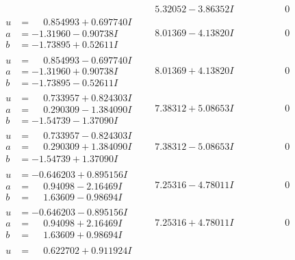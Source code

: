 \documentclass[1p]{elsarticle_modified}
\theoremstyle{definition}
\begin{document}
$$\begin{array}{c|c|c}
 & \phantom{-}5.32052 - 3.86352 I & \phantom{-0.000000 } 0 \\ \hline\begin{aligned}
u &= \phantom{-}0.854993 + 0.697740 I \\
a &= -1.31960 - 0.90738 I \\
b &= -1.73895 + 0.52611 I\end{aligned}
 & \phantom{-}8.01369 - 4.13820 I & \phantom{-0.000000 } 0 \\ \hline\begin{aligned}
u &= \phantom{-}0.854993 - 0.697740 I \\
a &= -1.31960 + 0.90738 I \\
b &= -1.73895 - 0.52611 I\end{aligned}
 & \phantom{-}8.01369 + 4.13820 I & \phantom{-0.000000 } 0 \\ \hline\begin{aligned}
u &= \phantom{-}0.733957 + 0.824303 I \\
a &= \phantom{-}0.290309 - 1.384090 I \\
b &= -1.54739 - 1.37090 I\end{aligned}
 & \phantom{-}7.38312 + 5.08653 I & \phantom{-0.000000 } 0 \\ \hline\begin{aligned}
u &= \phantom{-}0.733957 - 0.824303 I \\
a &= \phantom{-}0.290309 + 1.384090 I \\
b &= -1.54739 + 1.37090 I\end{aligned}
 & \phantom{-}7.38312 - 5.08653 I & \phantom{-0.000000 } 0 \\ \hline\begin{aligned}
u &= -0.646203 + 0.895156 I \\
a &= \phantom{-}0.94098 - 2.16469 I \\
b &= \phantom{-}1.63609 - 0.98694 I\end{aligned}
 & \phantom{-}7.25316 - 4.78011 I & \phantom{-0.000000 } 0 \\ \hline\begin{aligned}
u &= -0.646203 - 0.895156 I \\
a &= \phantom{-}0.94098 + 2.16469 I \\
b &= \phantom{-}1.63609 + 0.98694 I\end{aligned}
 & \phantom{-}7.25316 + 4.78011 I & \phantom{-0.000000 } 0 \\ \hline\begin{aligned}
u &= \phantom{-}0.622702 + 0.911924 I \\

\end{aligned}
\end{array}$$
\end{document}
